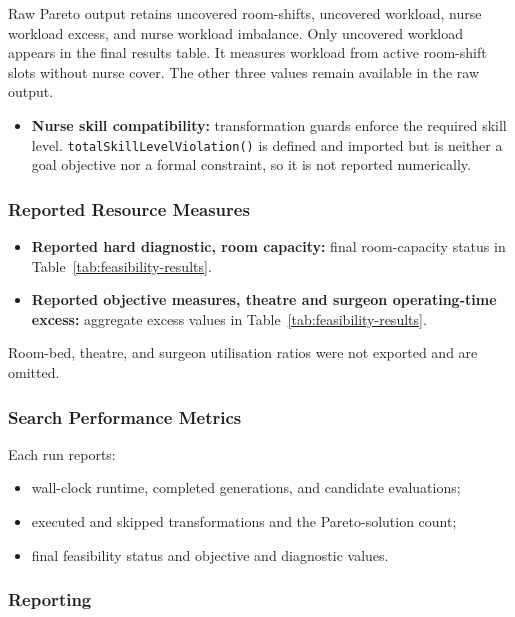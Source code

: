 \documentclass[11pt,a4paper]{article}
\begin{document}
Raw Pareto output retains uncovered room-shifts, uncovered workload, nurse workload excess, and nurse workload imbalance. Only uncovered workload appears in the final results table. It measures workload from active room-shift slots without nurse cover. The other three values remain available in the raw output.

\begin{itemize}
    \item \textbf{Nurse skill compatibility:} transformation guards enforce the required skill level. \texttt{totalSkillLevelViolation()} is defined and imported but is neither a goal objective nor a formal constraint, so it is not reported numerically.
\end{itemize}

\subsubsection{Reported Resource Measures}

\begin{itemize}
    \item \textbf{Reported hard diagnostic, room capacity:} final room-capacity status in Table~\ref{tab:feasibility-results}.
    \item \textbf{Reported objective measures, theatre and surgeon operating-time excess:} aggregate excess values in Table~\ref{tab:feasibility-results}.
\end{itemize}

Room-bed, theatre, and surgeon utilisation ratios were not exported and are omitted.

\subsubsection{Search Performance Metrics}

Each run reports:

\begin{itemize}
    \item wall-clock runtime, completed generations, and candidate evaluations;
    \item executed and skipped transformations and the Pareto-solution count;
    \item final feasibility status and objective and diagnostic values.
\end{itemize}

\subsubsection{Reporting}
\end{document}
